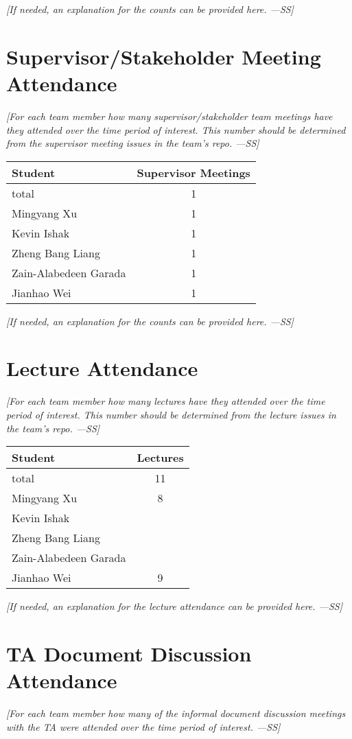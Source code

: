 \documentclass[12pt]{article}
\begin{document}
\textit{[If needed, an explanation for the counts can be provided here. ---SS]}

\section{Supervisor/Stakeholder Meeting Attendance}
\textit{[For each team member how many supervisor/stakeholder team meetings have they attended over the time period of interest. This number should be determined from the supervisor meeting issues in the team’s repo. ---SS]}

\begin{longtable}{|l|c|}
\hline
\textbf{Student} & \textbf{Supervisor Meetings} \\
\hline
total & 1 \\
Mingyang Xu & 1 \\
Kevin Ishak & 1 \\
Zheng Bang Liang & 1 \\
Zain-Alabedeen Garada & 1 \\
Jianhao Wei & 1 \\
\hline
\end{longtable}

\textit{[If needed, an explanation for the counts can be provided here. ---SS]}

\section{Lecture Attendance}
\textit{[For each team member how many lectures have they attended over the time period of interest. This number should be determined from the lecture issues in the team’s repo. ---SS]}

\begin{longtable}{|l|c|}
\hline
\textbf{Student} & \textbf{Lectures} \\
\hline
total & 11 \\
Mingyang Xu & 8 \\
Kevin Ishak &  \\
Zheng Bang Liang &  \\
Zain-Alabedeen Garada &  \\
Jianhao Wei & 9 \\
\hline
\end{longtable}

\textit{[If needed, an explanation for the lecture attendance can be provided here. ---SS]}

\section{TA Document Discussion Attendance}
\textit{[For each team member how many of the informal document discussion meetings with the TA were attended over the time period of interest. ---SS]}
\end{document}

